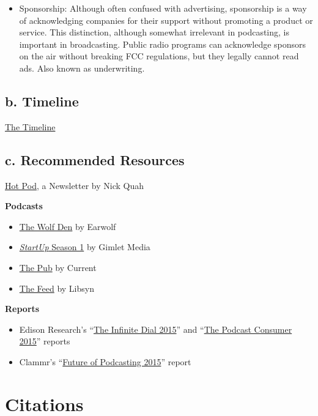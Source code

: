 \documentclass[notoc, symmetric, nobib, nols]{towcenter-guideto-book}
\newcommand{\blankpage}{\newpage\hbox{}\thispagestyle{empty}\newpage}
\begin{document}
\begin{itemize}
\item Sponsorship: Although often confused with advertising, sponsorship is a way of acknowledging companies for their support without promoting a product or service. This distinction, although somewhat irrelevant in podcasting, is important in broadcasting. Public radio programs can acknowledge sponsors on the air without breaking FCC regulations, but they legally cannot read ads. Also known as underwriting.
\end{itemize}


\section{b.  Timeline}

\href{http://cdn.knightlab.com/libs/timeline3/latest/embed/index.html?source=1PCTbosxqjGWzq2p84zxqAqAY4rVBjsHJlgFPJUEHR-Q&font=Default&lang=en&initial_zoom=2&height=650}{The Timeline}

\section{c.  Recommended Resources}
       
\href{https://tinyletter.com/hotpod}{Hot Pod}, a Newsletter by Nick Quah

\textbf{Podcasts}
\begin{itemize}
\item \href{http://www.earwolf.com/show/wolf-den/}{The Wolf Den} by Earwolf 
\item \href{https://gimletmedia.com/show/startup/episodes/season/season-1/page/2/}{\textit{StartUp} Season 1} by Gimlet Media
\item \href{http://current.org/category/thepub/}{The Pub} by Current
\item \href{http://thefeed.libsyn.com}{The Feed} by Libsyn
\end{itemize}

\textbf{Reports}
\begin{itemize}
\item Edison Research's ``\href{http://www.edisonresearch.com/the-infinite-dial-2015/}{The Infinite Dial 2015}'' and ``\href{http://www.edisonresearch.com/the-podcast-consumer-2015/}{The Podcast Consumer 2015}'' reports 
\item Clammr's ``\href{http://www.slideshare.net/clammrapp/20150617-future-of-podcasting-2015-clammr-v-f}{Future of Podcasting 2015}'' report 
\end{itemize}

\chapter{Citations}
\blankpage
\theendnotes
\end{document}
